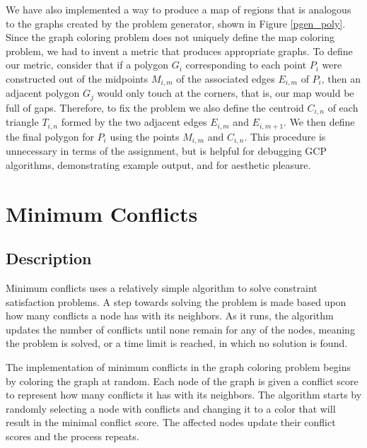 \documentclass{article}
\begin{document}
	We have also implemented a way to produce a map of regions that is analogous to the graphs created by the problem generator, shown in Figure \ref{pgen_poly}.  
	Since the graph coloring problem does not uniquely define the map coloring problem, we had to invent a metric that produces appropriate graphs. To define our metric, consider that if a polygon $G_i$ corresponding to each point $P_i$ were constructed out of the midpoints $M_{i,m}$ of the associated edges $E_{i,m}$ of $P_i$, then an adjacent polygon $G_j$ would only touch at the corners, that is, our map would be full of gaps. Therefore, to fix the problem we also define the centroid $C_{i,n}$ of each triangle $T_{i,n}$ formed by the two adjacent edges $E_{i,m}$ and $E_{i,m+1}$. We then define the final polygon for $P_i$ using the points $M_{i,m}$ and $C_{i,n}$. This procedure is unnecessary in terms of the assignment, but is helpful for debugging GCP algorithms, demonstrating example output, and for aesthetic pleasure.
		
\section{Minimum Conflicts}
	\subsection{Description}
		
		Minimum conflicts uses a relatively simple algorithm to solve constraint satisfaction problems.  A step towards solving the problem is made based upon how many conflicts a node has with its neighbors.  As it runs, the algorithm updates the number of conflicts until none remain for any of the nodes, meaning the problem is solved, or a time limit is reached, in which no solution is found.
		
		The implementation of minimum conflicts in the graph coloring problem begins by coloring the graph at random.  Each node of the graph is given a conflict score to represent how many conflicts it has with its neighbors.  The algorithm starts by randomly selecting a node with conflicts and changing it to a color that will result in the minimal conflict score.  The affected nodes update their conflict scores and the process repeats.
\end{document}
